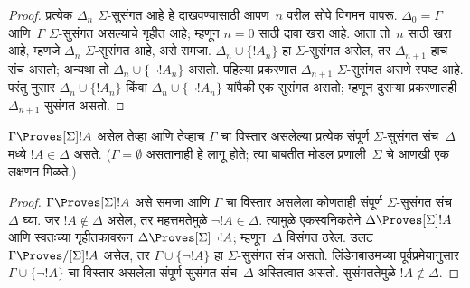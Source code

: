 \documentclass[../../../include/open-logic-section]{subfiles}
\begin{document}
\begin{proof}
प्रत्येक $\Delta_n$ $\Sigma$-सुसंगत आहे हे दाखवण्यासाठी
आपण~$n$ वरील सोपे विगमन वापरू. $\Delta_0 = \Gamma$
आणि~$\Gamma$ $\Sigma$-सुसंगत असल्याचे गृहीत आहे;
म्हणून $n = 0$ साठी दावा खरा आहे. आता तो~$n$
साठी खरा आहे, म्हणजे $\Delta_n$ $\Sigma$-सुसंगत
आहे, असे समजा. $\Delta_n \cup \{!A_n\}$ हा
$\Sigma$-सुसंगत असेल, तर $\Delta_{n+1}$ हाच
संच असतो; अन्यथा तो $\Delta_n \cup \{\lnot!A_n\}$
असतो. पहिल्या प्रकरणात $\Delta_{n+1}$
$\Sigma$-सुसंगत असणे स्पष्ट आहे. परंतु
नुसार $\Delta_n \cup \{!A_n\}$ किंवा
$\Delta_n \cup \{\lnot!A_n\}$ यांपैकी एक
सुसंगत असतो; म्हणून दुसऱ्या प्रकरणातही
$\Delta_{n+1}$ सुसंगत असतो.
\end{proof}

\begin{cor}
  $\Gamma \Proves[\Sigma] !A$ असेल तेव्हा आणि तेव्हाच
  $\Gamma$ चा विस्तार असलेल्या प्रत्येक संपूर्ण
  $\Sigma$-सुसंगत संच~$\Delta$ मध्ये $!A \in \Delta$
  असते. ($\Gamma = \emptyset$ असतानाही हे लागू होते;
  त्या बाबतीत मोडल प्रणाली~$\Sigma$ चे आणखी एक
  लक्षणन मिळते.)
\end{cor}

\begin{proof}
  $\Gamma \Proves[\Sigma] !A$ असे समजा आणि
  $\Gamma$ चा विस्तार असलेला कोणताही संपूर्ण
  $\Sigma$-सुसंगत संच~$\Delta$ घ्या. जर $!A
  \notin \Delta$ असेल, तर महत्तमतेमुळे
  $\lnot!A \in \Delta$. त्यामुळे एकस्वनिकतेने
  $\Delta \Proves[\Sigma] !A$ आणि स्वतःच्या गृहीतकावरून
  $\Delta \Proves[\Sigma] \lnot!A$; म्हणून~$\Delta$
  विसंगत ठरेल. उलट $\Gamma \Proves/[\Sigma] !A$
  असेल, तर $\Gamma \cup \{ \lnot!A\}$ हा
  $\Sigma$-सुसंगत संच असतो. लिंडेनबाउमच्या
  पूर्वप्रमेयानुसार $\Gamma \cup \{ \lnot!A \}$
  चा विस्तार असलेला संपूर्ण सुसंगत संच~$\Delta$
  अस्तित्वात असतो. सुसंगततेमुळे $!A
  \notin \Delta$.
\end{proof}
\end{document}
